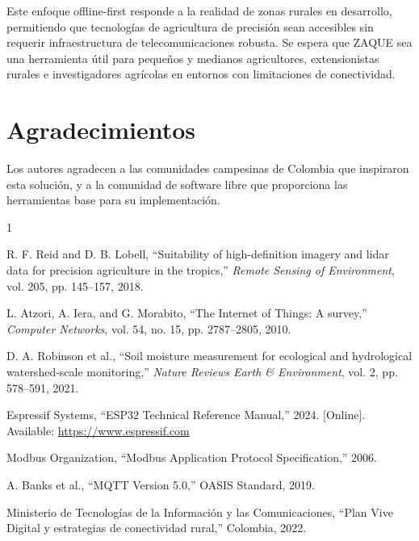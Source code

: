 \documentclass[journal]{IEEEtran}
\begin{document}
Este enfoque offline-first responde a la realidad de zonas rurales en desarrollo, permitiendo que tecnologías de agricultura de precisión sean accesibles sin requerir infraestructura de telecomunicaciones robusta. Se espera que ZAQUE sea una herramienta útil para pequeños y medianos agricultores, extensionistas rurales e investigadores agrícolas en entornos con limitaciones de conectividad.

\section*{Agradecimientos}

Los autores agradecen a las comunidades campesinas de Colombia que inspiraron esta solución, y a la comunidad de software libre que proporciona las herramientas base para su implementación.

\begin{thebibliography}{1}

R. F. Reid and D. B. Lobell, ``Suitability of high-definition imagery and lidar data for precision agriculture in the tropics,'' \textit{Remote Sensing of Environment}, vol. 205, pp. 145--157, 2018.

L. Atzori, A. Iera, and G. Morabito, ``The Internet of Things: A survey,'' \textit{Computer Networks}, vol. 54, no. 15, pp. 2787--2805, 2010.

D. A. Robinson et al., ``Soil moisture measurement for ecological and hydrological watershed-scale monitoring,'' \textit{Nature Reviews Earth \& Environment}, vol. 2, pp. 578--591, 2021.

Espressif Systems, ``ESP32 Technical Reference Manual,'' 2024. [Online]. Available: \url{https://www.espressif.com}

Modbus Organization, ``Modbus Application Protocol Specification,'' 2006.

A. Banks et al., ``MQTT Version 5.0,'' OASIS Standard, 2019.

Ministerio de Tecnologías de la Información y las Comunicaciones, ``Plan Vive Digital y estrategias de conectividad rural,'' Colombia, 2022.

\end{thebibliography}
\end{document}
